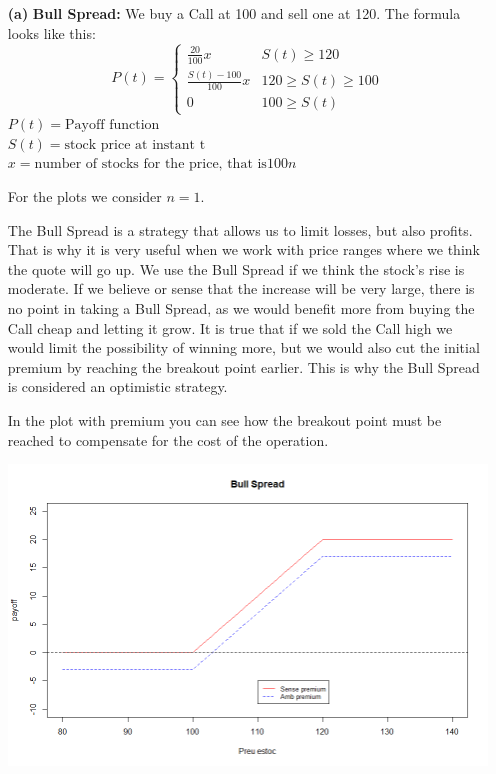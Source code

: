 \documentclass[a4paper,]{article}
\begin{document}
\begin{itemize}
    \item[\textbf{(a)}] \textbf{Bull Spread:} We buy a Call at 100 and sell one at 120. The formula looks like this:
    \[ 
    P(t)=
    \begin{cases} 
      \frac{20}{100}x & S(t)\geq 120 \\
      \frac{S(t)-100}{100}x & 120\geq S(t)\geq 100 \\
      0 & 100\geq S(t) 
   \end{cases}
    \]
    $P(t)=\text{Payoff function}$\\
    $S(t)=\text{stock price at instant t}$\\
    $x=\text{number of stocks for the price, that is} 100n$


   For the plots we consider $n=1$.
    
    \vspace{3mm}
    \noindent
    
    The Bull Spread is a strategy that allows us to limit losses, but also profits. That is why it is very useful when we work with price ranges where we think the quote will go up. We use the Bull Spread if we think the stock's rise is moderate. If we believe or sense that the increase will be very large, there is no point in taking a Bull Spread, as we would benefit more from buying the Call cheap and letting it grow. It is true that if we sold the Call high we would limit the possibility of winning more, but we would also cut the initial premium by reaching the breakout point earlier. This is why the Bull Spread is considered an optimistic strategy.
    
    \vspace{3mm}
    \noindent
    In the plot with premium you can see how the breakout point must be reached to compensate for the cost of the operation.
    
    \begin{center}
        \includegraphics[scale=0.5]{Bull Spread.png}
    \end{center}
    

\end{itemize}
\end{document}

